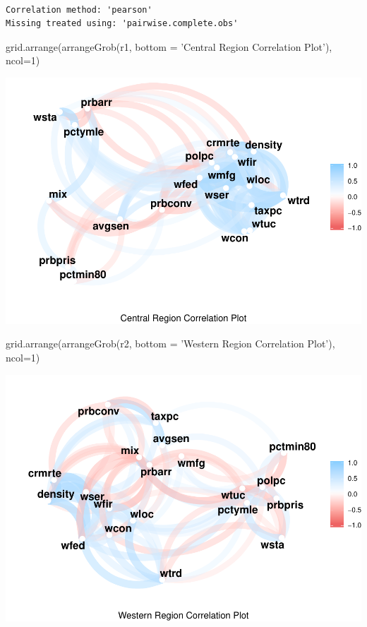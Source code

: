\documentclass[]{article}
\newenvironment{Shaded}{}{}
\newcommand{\DataTypeTok}[1]{#1}
\newcommand{\DecValTok}[1]{#1}
\newcommand{\KeywordTok}[1]{\textcolor[rgb]{0.00,0.00,1.00}{#1}}
\newcommand{\NormalTok}[1]{#1}
\newcommand{\StringTok}[1]{\textcolor[rgb]{0.00,0.50,0.50}{#1}}
\begin{document}
\begin{verbatim}

Correlation method: 'pearson'
Missing treated using: 'pairwise.complete.obs'
\end{verbatim}

\begin{Shaded}
\begin{Highlighting}[]
\KeywordTok{grid.arrange}\NormalTok{(}\KeywordTok{arrangeGrob}\NormalTok{(r1, }\DataTypeTok{bottom =} \StringTok{'Central Region Correlation Plot'}\NormalTok{), }\DataTypeTok{ncol=}\DecValTok{1}\NormalTok{)}
\end{Highlighting}
\end{Shaded}

\includegraphics{Bagnard_Gaustad_Hartman_Leung_Lab_3_files/figure-latex/unnamed-chunk-91-1.pdf}

\begin{Shaded}
\begin{Highlighting}[]
\KeywordTok{grid.arrange}\NormalTok{(}\KeywordTok{arrangeGrob}\NormalTok{(r2, }\DataTypeTok{bottom =} \StringTok{'Western Region Correlation Plot'}\NormalTok{), }\DataTypeTok{ncol=}\DecValTok{1}\NormalTok{)}
\end{Highlighting}
\end{Shaded}

\includegraphics{Bagnard_Gaustad_Hartman_Leung_Lab_3_files/figure-latex/unnamed-chunk-91-2.pdf}
\end{document}
